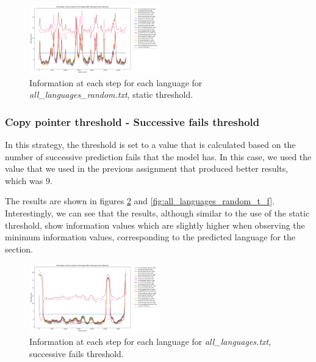 \documentclass{article}
\begin{document}
\begin{figure}
    \centering
    \includegraphics[width=0.5\textwidth]{../results/all_languages_random/-t_n:0.5.png}
    \caption{Information at each step for each language for \textit{all\_languages\_random.txt}, static threshold.}
    \label{fig:all_languages_random_t_n}
\end{figure}

\subsubsection{Copy pointer threshold - Successive fails threshold}
\label{subsubsec:results_locate_lang_successive_fails_threshold}

In this strategy, the threshold is set to a value that is calculated based on the number of successive prediction fails that the model has.
In this case, we used the value that we used in the previous assignment that produced better results, which was $9$.

The results are shown in figures \ref{fig:all_languages_t_f} and \ref{fig:all_languages_random_t_f}.
Interestingly, we can see that the results, although similar to the use of the static threshold,
show information values which are slightly higher when observing the minimum information values, corresponding to the predicted language for the section. %

\begin{figure}
    \centering
    \includegraphics[width=0.5\textwidth]{../results/all_languages/-t_f:9.png}
    \caption{Information at each step for each language for \textit{all\_languages.txt}, successive fails threshold.}
    \label{fig:all_languages_t_f}
\end{figure}
\end{document}

